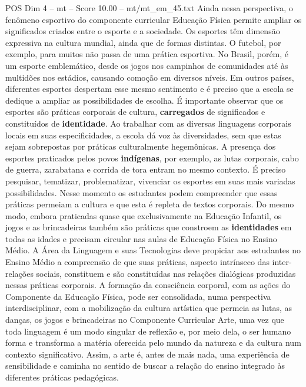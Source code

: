 \begin{textsample}{POS Dim 4 – mt – Score 10.00 – mt/mt\_em\_45.txt}  \label{ex:f4_pos_175}
Ainda nessa perspectiva, o fenômeno esportivo do componente curricular Educação Física permite ampliar os significados criados entre o esporte e a sociedade.
Os esportes têm dimensão expressiva na cultura mundial, ainda que de formas distintas.
O futebol, por exemplo, para muitos não passa de uma prática esportiva.
No Brasil, porém, é um esporte emblemático, desde os jogos nos campinhos de comunidades até às multidões nos estádios, causando comoção em diversos níveis.
Em outros países, diferentes esportes despertam esse mesmo sentimento e é preciso que a escola se dedique a ampliar as possibilidades de escolha.
É importante observar que os esportes são práticas corporais de cultura, \textbf{carregados} de significados e constituídos de \textbf{identidade}.
Ao trabalhar com as diversas linguagens corporais locais em suas especificidades, a escola dá voz às diversidades, sem que estas sejam sobrepostas por práticas culturalmente hegemônicas.
A presença dos esportes praticados pelos povos \textbf{indígenas}, por exemplo, as lutas corporais, cabo de guerra, zarabatana e corrida de tora entram no mesmo contexto.
É preciso pesquisar, tematizar, problematizar, vivenciar os esportes em suas mais variadas possibilidades.
Nesse momento os estudantes podem compreender que essas práticas permeiam a cultura e que esta é repleta de textos corporais.
Do mesmo modo, embora praticadas quase que exclusivamente na Educação Infantil, os jogos e as brincadeiras também são práticas que constroem as \textbf{identidades} em todas as idades e precisam circular nas aulas de Educação Física no Ensino Médio.
A Área da Linguagem e suas Tecnologias deve propiciar aos estudantes no Ensino Médio a compreensão de que suas práticas, aspecto intrínseco das inter-relações sociais, constituem e são constituídas nas relações dialógicas produzidas nessas práticas corporais.
A formação da consciência corporal, com as ações do Componente da Educação Física, pode ser consolidada, numa perspectiva interdisciplinar, com a mobilização da cultura artística que permeia as lutas, as danças, os jogos e brincadeiras no Componente Curricular Arte, uma vez que toda linguagem é um modo singular de reflexão e, por meio dela, o ser humano forma e transforma a matéria oferecida pelo mundo da natureza e da cultura num contexto significativo.
Assim, a arte é, antes de mais nada, uma experiência de sensibilidade e caminha no sentido de buscar a relação do ensino integrado às diferentes práticas pedagógicas.

\end{textsample}
